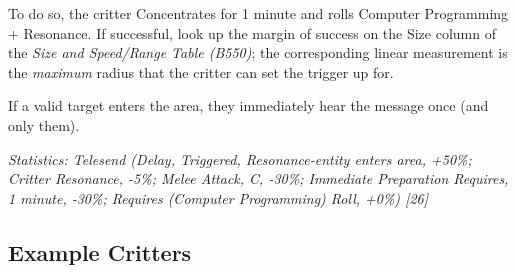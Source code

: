 \begin{multicols*}{3}
	To do so, the critter Concentrates for 1 minute and rolls Computer Programming + Resonance. If successful, look up the margin of success on the Size column of the \textit{Size and Speed/Range Table (B550)}; the corresponding linear measurement is the \textit{maximum} radius that the critter can set the trigger up for.
	
	If a valid target enters the area, they immediately hear the message once (and only them).
	
	\textcolor{OliveGreen}{\textit{Statistics: Telesend (Delay, Triggered, Resonance-entity enters area, +50\%; Critter Resonance, -5\%; Melee Attack, C, -30\%; Immediate Preparation Requires, 1 minute, -30\%; Requires (Computer Programming) Roll, +0\%) [26] }}
	
	\subsection{Example Critters}
	
\end{multicols*}